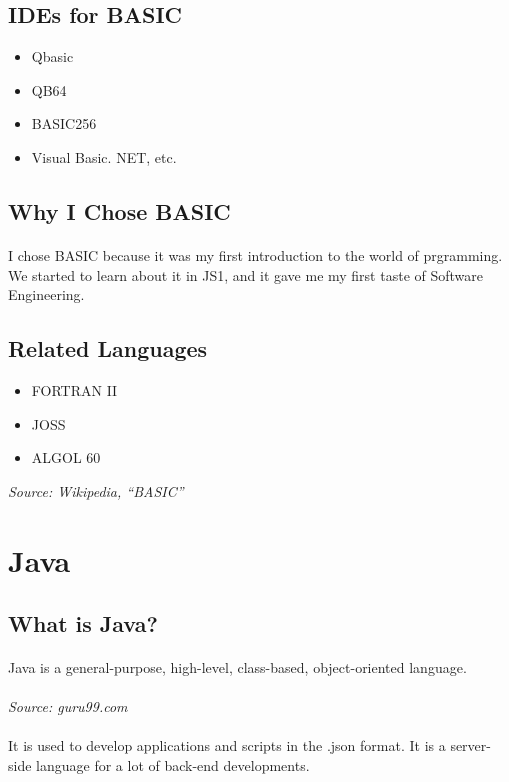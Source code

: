 \documentclass{article}
\begin{document}
	\subsection*{IDEs for BASIC}
	\begin{itemize}
		\item Qbasic
		\item QB64
		\item BASIC256
		\item Visual Basic. NET, etc.
	\end{itemize}
	\subsection*{Why I Chose BASIC}
	\paragraph{}I chose BASIC because it was my first introduction to the world of prgramming.
	We started to learn about it in JS1, and it gave me my first taste of Software Engineering.
	\subsection*{Related Languages}
	\begin{itemize}
	\item FORTRAN II
	\item JOSS
	\item ALGOL 60
	\end{itemize}
	\textit{Source: Wikipedia, “BASIC”}
	
	
	\section*{Java}
	\subsection*{What is Java?}
	\paragraph{}Java is a general-purpose, high-level, class-based, object-oriented language.
	\paragraph{}\textit{Source: guru99.com}
	\paragraph{}It is used to develop applications and scripts in the .json format.
	It is a server-side language for a lot of back-end developments.
\end{document}
